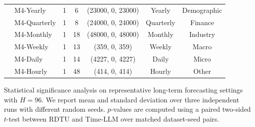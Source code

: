 \documentclass[10pt]{article}
\begin{document}
\begin{minipage}{5.5in}
{\begin{threeparttable}
\begin{tabular}{c|l|c|c|c|c|c}
                    & M4-Yearly & 1 & 6 & (23000, 0, 23000) & Yearly & Demographic \\ 
          & M4-Quarterly & 1 & 8 & (24000, 0, 24000) & Quarterly & Finance \\ 
          & M4-Monthly & 1 & 18 & (48000, 0, 48000) & Monthly & Industry \\ 
          & M4-Weekly & 1 & 13 & (359, 0, 359) & Weekly & Macro \\ 
          & M4-Daily & 1 & 14 & (4227, 0, 4227) & Daily & Micro \\ 
          & M4-Hourly & 1 & 48 & (414, 0, 414) & Hourly & Other \\
        \hline
      \end{tabular}
    \end{threeparttable}
  }

\end{minipage}\par\endgroup

\clearpage\begingroup

\setcounter{table}{7}

\begin{minipage}{5.5in}

\setlength{\textwidth}{\linewidth}

\captionsetup{type=table}

\centering
\caption{Statistical significance analysis on representative long-term forecasting settings with $H=96$. We report mean and standard deviation over three independent runs with different random seeds. $p$-values are computed using a paired two-sided $t$-test between RDTU and Time-LLM over matched dataset-seed pairs.}
\label{tab:significance_main}

\end{minipage}\par\endgroup
\end{document}
